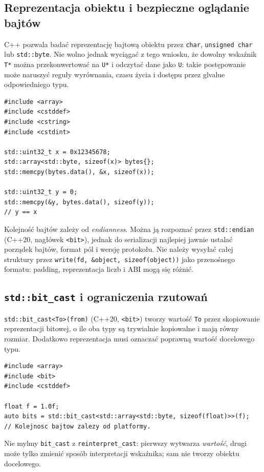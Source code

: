 \subsection{Reprezentacja obiektu i bezpieczne oglądanie bajtów}

C++ pozwala badać reprezentację bajtową obiektu przez
\texttt{char}, \texttt{unsigned char} lub \texttt{std::byte}.
Nie wolno jednak wyciągać z tego wniosku, że dowolny wskaźnik
\texttt{T*} można przekonwertować na \texttt{U*} i odczytać dane jako
\texttt{U}: takie postępowanie może naruszyć reguły wyrównania,
czasu życia i dostępu przez glvalue odpowiedniego typu.

\begin{lstlisting}
#include <array>
#include <cstddef>
#include <cstring>
#include <cstdint>

std::uint32_t x = 0x12345678;
std::array<std::byte, sizeof(x)> bytes{};
std::memcpy(bytes.data(), &x, sizeof(x));

std::uint32_t y = 0;
std::memcpy(&y, bytes.data(), sizeof(y));
// y == x
\end{lstlisting}

Kolejność bajtów zależy od \emph{endianness}. Można ją rozpoznać przez
\texttt{std::endian} (C++20, nagłówek \texttt{<bit>}), jednak do
serializacji najlepiej jawnie ustalać porządek bajtów, format pól
i wersję protokołu. Nie należy wysyłać całej struktury przez
\texttt{write(fd, \&object, sizeof(object))} jako przenośnego formatu:
padding, reprezentacja liczb i ABI mogą się różnić.

\subsection{\texttt{std::bit\_cast} i ograniczenia rzutowań}

\texttt{std::bit\_cast<To>(from)} (C++20, \texttt{<bit>}) tworzy wartość
\texttt{To} przez skopiowanie reprezentacji bitowej, o ile oba typy
są trywialnie kopiowalne i mają równy rozmiar. Dodatkowo reprezentacja
musi oznaczać poprawną wartość docelowego typu.

\begin{lstlisting}
#include <array>
#include <bit>
#include <cstddef>

float f = 1.0f;
auto bits = std::bit_cast<std::array<std::byte, sizeof(float)>>(f);
// Kolejnosc bajtow zalezy od platformy.
\end{lstlisting}

Nie mylmy \texttt{bit\_cast} z \texttt{reinterpret\_cast}:
pierwszy wytwarza \emph{wartość}, drugi może tylko zmienić sposób
interpretacji wskaźnika; sam nie tworzy obiektu docelowego.

